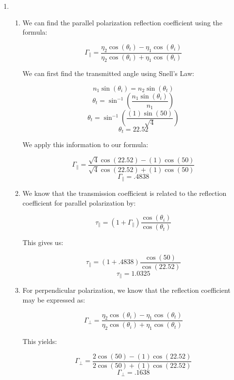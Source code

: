 \begin{enumerate}
\begin{enumerate}
      \item 

      \item 

    \end{enumerate}

  \item

    \begin{enumerate}

      \item 

        We can find the parallel polarization reflection coefficient using the formula:

        $$\Gamma_{\parallel}=\frac{\eta_2\cos(\theta_t)-\eta_1\cos(\theta_i)}{\eta_2\cos(\theta_i)+\eta_1\cos(\theta_i)}$$

        We can first find the transmitted angle using Snell's Law:

        $$n_1\sin(\theta_i)=n_2\sin(\theta_t)$$
        $$\theta_t=\sin^{-1}\left(\frac{n_1\sin(\theta_i)}{n_1}\right)$$
        $$\theta_t=\sin^{-1}\left(\frac{(1)\sin(50)}{\sqrt{4}}\right)$$
        $$\theta_t=22.52$$

        We apply this information to our formula:

        $$\Gamma_{\parallel}=\frac{\sqrt{4}\cos(22.52)-(1)\cos(50)}{\sqrt{4}\cos(22.52)+(1)\cos(50)}$$
        $$\boxed{\Gamma_{\parallel}=.4838}$$


      \item 

        We know that the transmission coefficient is related to the reflection coefficient for parallel polarization by:

        $$\tau_{\parallel}=(1+\Gamma_{\parallel})\frac{\cos(\theta_i)}{\cos(\theta_t)}$$

        This gives us:

        $$\tau_{\parallel}=(1+.4838)\frac{\cos(50)}{\cos(22.52)}$$
        $$\boxed{\tau_{\parallel}=1.0325}$$

      \item 

        For perpendicular polarization, we know that the reflection coefficient may be expressed as:

        $$\Gamma_{\perp}=\frac{\eta_2\cos(\theta_i)-\eta_1\cos(\theta_t)}{\eta_2\cos(\theta_i)+\eta_1\cos(\theta_t)}$$

        This yields:

        $$\Gamma_{\perp}=\frac{2\cos(50)-(1)\cos(22.52)}{2\cos(50)+(1)\cos(22.52)}$$
        $$\boxed{\Gamma_{\perp}=.1638}$$


\end{enumerate}
\end{enumerate}
